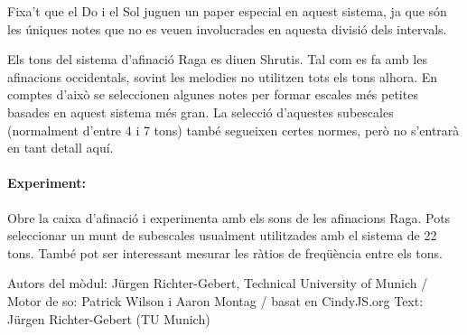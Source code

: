 Fixa't que el Do i el Sol juguen un paper especial en aquest sistema, ja que són les úniques notes que no es veuen involucrades en aquesta divisió dels intervals.

Els tons del sistema d'afinació Raga es diuen Shrutis. Tal com es fa amb les afinacions occidentals, sovint les melodies no utilitzen tots els tons alhora. En comptes d'això se seleccionen algunes notes per formar escales més petites basades en aquest sistema més gran. La selecció d'aquestes subescales (normalment d'entre 4 i 7 tons) també segueixen certes normes, però no s'entrarà en tant detall aquí.

\paragraph{Experiment:}
Obre la caixa d'afinació i experimenta amb els sons de les afinacions Raga. Pots seleccionar un munt de subescales usualment utilitzades amb el sistema de 22 tons. També pot ser interessant mesurar les ràtios de freqüència entre els tons. 

\vfill
Autors del mòdul: Jürgen Richter-Gebert, Technical University of Munich / Motor de so: Patrick Wilson i Aaron Montag / basat en CindyJS.org
Text: Jürgen Richter-Gebert (TU Munich)


